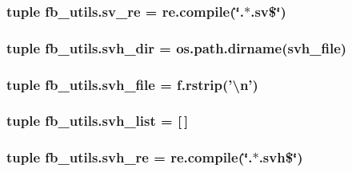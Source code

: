 \hypertarget{namespacefb__utils_a73e264c0b4abac47696cb9af5442ff77}{
\subsubsection[{sv\-\_\-re}]{\setlength{\rightskip}{0pt plus 5cm}tuple fb\-\_\-utils.\-sv\-\_\-re = re.\-compile(\char`\"{}.$\ast$.sv\$\char`\"{})}}\label{namespacefb__utils_a73e264c0b4abac47696cb9af5442ff77}
\hypertarget{namespacefb__utils_a9a7552d7646f614253b152fd60621a1a}{
\subsubsection[{svh\-\_\-dir}]{\setlength{\rightskip}{0pt plus 5cm}tuple fb\-\_\-utils.\-svh\-\_\-dir = os.\-path.\-dirname({\bf svh\-\_\-file})}}\label{namespacefb__utils_a9a7552d7646f614253b152fd60621a1a}
\hypertarget{namespacefb__utils_a0b4a172289f8da0c591105716fec6a20}{
\subsubsection[{svh\-\_\-file}]{\setlength{\rightskip}{0pt plus 5cm}tuple fb\-\_\-utils.\-svh\-\_\-file = f.\-rstrip('\textbackslash{}n')}}\label{namespacefb__utils_a0b4a172289f8da0c591105716fec6a20}
\hypertarget{namespacefb__utils_a1ee53c4fb1a76769ec7757ab432117e0}{
\subsubsection[{svh\-\_\-list}]{\setlength{\rightskip}{0pt plus 5cm}tuple fb\-\_\-utils.\-svh\-\_\-list = \mbox{[}$\,$\mbox{]}}}\label{namespacefb__utils_a1ee53c4fb1a76769ec7757ab432117e0}
\hypertarget{namespacefb__utils_a5fafe279f7921831dd52acdc8a7fb0fc}{
\subsubsection[{svh\-\_\-re}]{\setlength{\rightskip}{0pt plus 5cm}tuple fb\-\_\-utils.\-svh\-\_\-re = re.\-compile(\char`\"{}.$\ast$.svh\$\char`\"{})}}\label{namespacefb__utils_a5fafe279f7921831dd52acdc8a7fb0fc}
